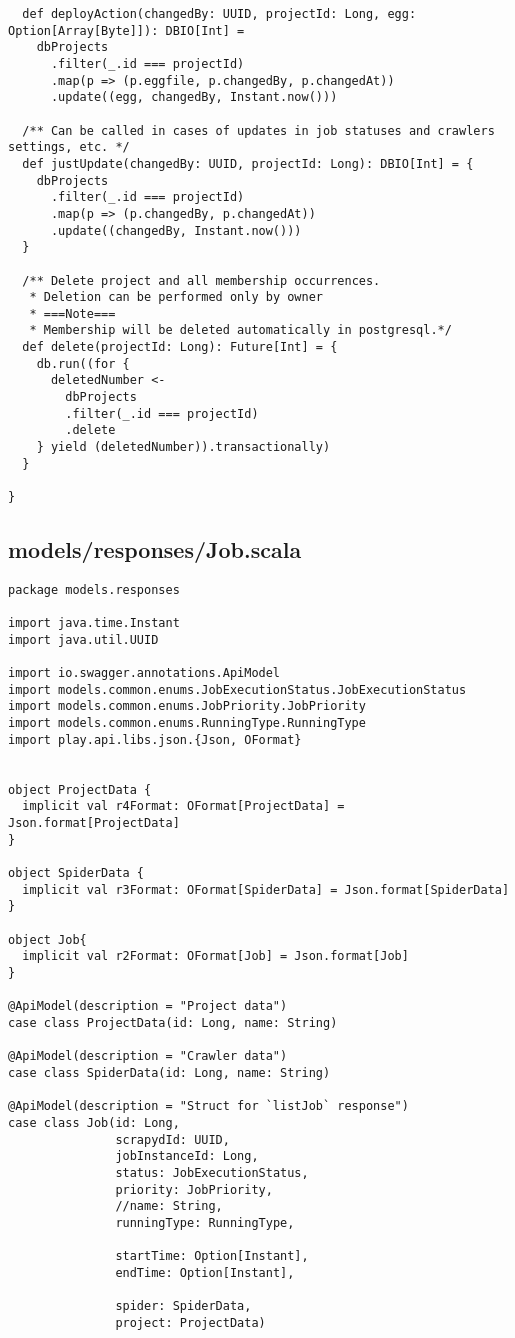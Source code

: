 \begin{lstlisting}
  def deployAction(changedBy: UUID, projectId: Long, egg: Option[Array[Byte]]): DBIO[Int] =
    dbProjects
      .filter(_.id === projectId)
      .map(p => (p.eggfile, p.changedBy, p.changedAt))
      .update((egg, changedBy, Instant.now()))

  /** Can be called in cases of updates in job statuses and crawlers settings, etc. */
  def justUpdate(changedBy: UUID, projectId: Long): DBIO[Int] = {
    dbProjects
      .filter(_.id === projectId)
      .map(p => (p.changedBy, p.changedAt))
      .update((changedBy, Instant.now()))
  }

  /** Delete project and all membership occurrences.
   * Deletion can be performed only by owner
   * ===Note===
   * Membership will be deleted automatically in postgresql.*/
  def delete(projectId: Long): Future[Int] = {
    db.run((for {
      deletedNumber <-
        dbProjects
        .filter(_.id === projectId)
        .delete
    } yield (deletedNumber)).transactionally)
  }

}
\end{lstlisting}
\subsection{models/responses/Job.scala}
\begin{lstlisting}
package models.responses

import java.time.Instant
import java.util.UUID

import io.swagger.annotations.ApiModel
import models.common.enums.JobExecutionStatus.JobExecutionStatus
import models.common.enums.JobPriority.JobPriority
import models.common.enums.RunningType.RunningType
import play.api.libs.json.{Json, OFormat}


object ProjectData {
  implicit val r4Format: OFormat[ProjectData] = Json.format[ProjectData]
}

object SpiderData {
  implicit val r3Format: OFormat[SpiderData] = Json.format[SpiderData]
}

object Job{
  implicit val r2Format: OFormat[Job] = Json.format[Job]
}

@ApiModel(description = "Project data")
case class ProjectData(id: Long, name: String)

@ApiModel(description = "Crawler data")
case class SpiderData(id: Long, name: String)

@ApiModel(description = "Struct for `listJob` response")
case class Job(id: Long,
               scrapydId: UUID,
               jobInstanceId: Long,
               status: JobExecutionStatus,
               priority: JobPriority,
               //name: String,
               runningType: RunningType,

               startTime: Option[Instant],
               endTime: Option[Instant],

               spider: SpiderData,
               project: ProjectData)
\end{lstlisting}
